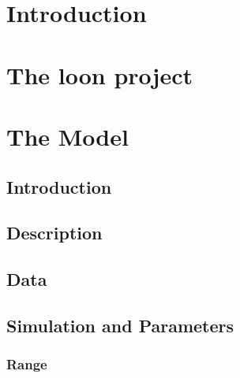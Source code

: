 \documentclass[A4,openany,12pt]{article}
\begin{document}
\doublespacing
\lstset{language=java}



\tableofcontents

\thispagestyle{empty}
\listoffigures
\thispagestyle{empty}
\printnomenclature
\thispagestyle{empty}
\cleardoublepage
{}


\begin{abstract}
    
\end{abstract}
\pagebreak
\section{Introduction}


\section{The loon project}


\section{The Model}\label{theModel}

\subsection{Introduction}\label{theModel_intro}



\subsection{Description}\label{theModel_description}


\subsection{Data}\label{theModel_data}



\subsection{Simulation and Parameters}\label{theModel_snp}


\subsubsection{Range}\label{theModel_numBal}

\end{document}

